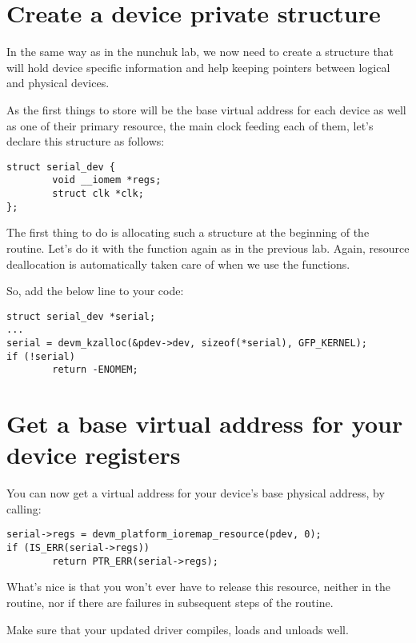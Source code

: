 \section{Create a device private structure}

In the same way as in the nunchuk lab, we now need to create a
structure that will hold device specific information and help
keeping pointers between logical and physical devices.

As the first things to store will be the base virtual address for
each device as well as one of their primary resource, the main clock feeding
each of them, let's declare this structure as follows:

\begin{verbatim}
struct serial_dev {
        void __iomem *regs;
        struct clk *clk;
};
\end{verbatim}

The first thing to do is allocating such a structure at the beginning
of the  routine. Let's do it with the 
function again as in the previous lab. Again, resource deallocation is
automatically taken care of when we use the  functions.

So, add the below line to your code:

\begin{verbatim}
struct serial_dev *serial;
...
serial = devm_kzalloc(&pdev->dev, sizeof(*serial), GFP_KERNEL);
if (!serial)
        return -ENOMEM;
\end{verbatim}

\section{Get a base virtual address for your device registers}

You can now get a virtual address for your device's base physical
address, by calling:

\begin{verbatim}
serial->regs = devm_platform_ioremap_resource(pdev, 0);
if (IS_ERR(serial->regs))
        return PTR_ERR(serial->regs);
\end{verbatim}

What's nice is that you won't ever have to release this resource,
neither in the  routine, nor if there are failures
in subsequent steps of the  routine.

Make sure that your updated driver compiles, loads and unloads well.

